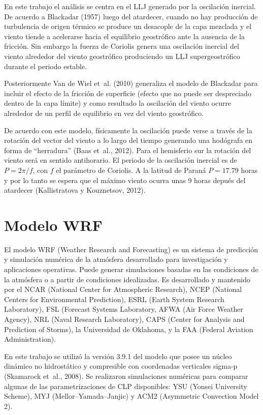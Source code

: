 \documentclass[12pt,spanish,oneside, a4paper]{book}
\begin{document}
En este trabajo el análisis se centra en el LLJ generado por la
oscilación inercial. De acuerdo a Blackadar (1957) luego del atardecer,
cuando no hay producción de turbulencia de origen térmico se produce un
desacople de la capa mezclada y el viento tiende a acelerarse hacia el
equilibrio geostrófico ante la ausencia de la fricción. Sin embargo la
fuerza de Coriolis genera una oscilación inercial del viento alrededor
del viento geostrófico produciendo un LLJ supergeostrófico durante el
periodo estable.

Posteriormente Van de Wiel et~al. (2010) generaliza el modelo de
Blackadar para incluir el efecto de la fricción de superficie (efecto
que no puede ser despreciado dentro de la capa límite) y como resultado
la oscilación del viento ocurre alrededor de un perfil de equilibrio en
vez del viento geostrófico.

De acuerdo con este modelo, físicamente la oscilación puede verse a
través de la rotación del vector del viento a lo largo del tiempo
generando una hodógrafa en forma de ``herradura'' (Baas et~al., 2012).
Para el hemisferio sur la rotación del viento será en sentido
antihorario. El periodo de la oscilación inercial es de \(P = 2\pi/f\),
con \(f\) el parámetro de Coriolis. A la latitud de Paraná \(P = 17.79\)
horas y por lo tanto se espera que el máximo viento ocurra unas 9 horas
depués del atardecer (Kallistratova y Kouznetsov, 2012).

\section{Modelo WRF}\label{modelo-wrf}

El modelo WRF (Weather Research and Forecasting) es un sistema de
predicción y simulación numérica de la atmósfera desarrollado para
investigación y aplicaciones operativas. Puede generar simulaciones
basadas en las condiciones de la atmósfera o a partir de condiciones
idealizadas. Es desarrollado y mantenido por el NCAR (National Center
for Atmospheric Research), NCEP (National Centers for Environmental
Prediction), ESRL (Earth System Research Laboratory), FSL (Forecast
Systems Laboratory, AFWA (Air Force Weather Agency), NRL (Naval Research
Laboratory), CAPS (Center for Analysis and Prediction of Storms), la
Universidad de Oklahoma, y la FAA (Federal Aviation Administration).

En este trabajo se utilizó la versión 3.9.1 del modelo que posee un
núcleo dinámico no hidrostático y compresible con coordenadas verticales
sigma-p (Skamarock et~al., 2008). Se realizaron simulaciones numéricas
para comparar algunas de las parametrizaciones de CLP disponibles: YSU
(Yonsei University Scheme), MYJ (Mellor--Yamada--Janjic) y ACM2
(Asymmetric Convection Model 2).
\end{document}
